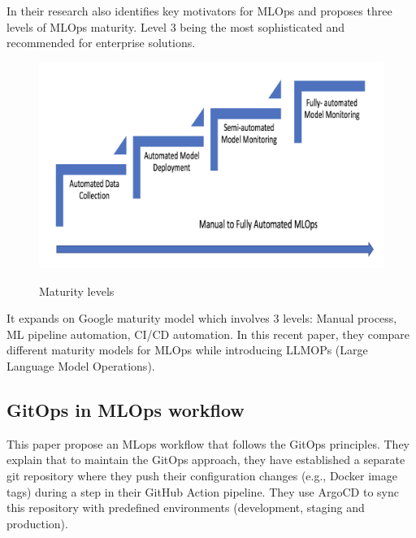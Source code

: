 In their research\cite{inproceedings} also identifies key motivators for MLOps and proposes three levels of MLOps maturity.
Level 3 being the most sophisticated and recommended for enterprise solutions.

\begin{figure}[!htbp]
    \caption{Maturity levels \cite{mlops-maturity-model}}
    \centering
    \includegraphics[scale=0.5]{images/maturity-levels}
    \label{fig:maturity}
\end{figure}

It expands on Google maturity model\cite{google-mlops} which involves 3 levels: Manual process, ML pipeline automation, CI/CD automation.
In this recent paper\cite{unknown}, they compare different maturity models for MLOps while introducing LLMOPs (Large Language Model Operations).

\subsection{GitOps in MLOps workflow}\label{subsec:gitops-in-mlops-workflow}

This paper\cite{mlops-gitops} propose an MLops workflow that follows the GitOps principles.
They explain that to maintain the GitOps approach, they have established a separate git repository
where they push their configuration changes (e.g., Docker image tags) during a step in their GitHub Action pipeline.
They use ArgoCD to sync this repository with predefined environments (development, staging and production).

